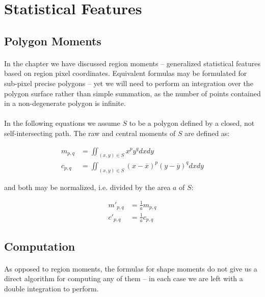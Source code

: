 
\section{Statistical Features}

\subsection{Polygon Moments}

\paragraph*{}
In the  chapter we have discussed region moments -- generalized statistical features based on region pixel coordinates. Equivalent formulas may be formulated for sub-pixel precise polygons -- yet we will need to perform an integration over the polygon surface rather than simple summation, as the number of points contained in a non-degenerate polygon is infinite.

\paragraph*{}
In the following equations we assume $S$ to be a polygon defined by a closed, not self-intersecting path. The raw and central moments of $S$ are defined as:

\begin{align*}
	m_{p,q} &= \iint_{(x,y) \in S} x^p y^q dx dy \\
	c_{p,q} &= \iint_{(x,y) \in S} (x-\overline{x})^p (y-\overline{y})^q dx dy
\end{align*}

and both may be normalized, i.e. divided by the area $a$ of $S$:

\begin{align*}
	m'_{p,q} &= \frac{1}{a} m_{p,q}\\
	c'_{p,q} &= \frac{1}{a} c_{p,q}
\end{align*}

\subsection{Computation}

\paragraph*{}
As opposed to region moments, the formulas for shape moments do not give us a direct algorithm for computing any of them -- in each case we are left with a double integration to perform.


